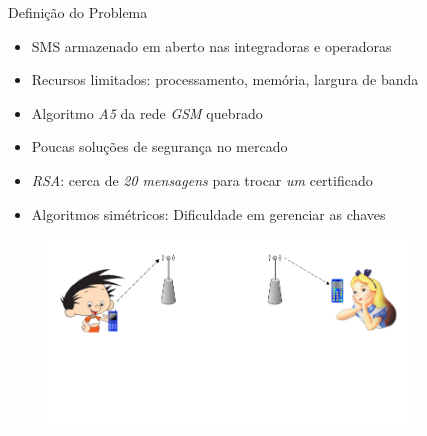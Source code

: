\documentclass[notes,blue,mathserif]{beamer}
\begin{document}



\begin{frame}{Defini\c{c}\~{a}o do Problema}
\begin{itemize}[<+->]
\item SMS armazenado em aberto nas integradoras\/ e operadoras
\item Recursos limitados: processamento, mem\'{o}ria, largura de banda
\item Algoritmo \emph{A5} da rede \emph{GSM} quebrado
\item Poucas solu\c{c}\~{o}es de seguran\c{c}a no mercado
\item \emph{RSA}: cerca de \textit{20 mensagens} para trocar \textit{um} certificado
\item Algoritmos sim\'{e}tricos: Dificuldade em gerenciar as chaves
\end{itemize}
\end{frame}

\begin{frame}{}
\begin{figure}
	\centering
		\includegraphics[width=0.85\textwidth]{figuras/1.png}
	\label{fig:arq1}
\end{figure}
\end{frame}
\end{document}
